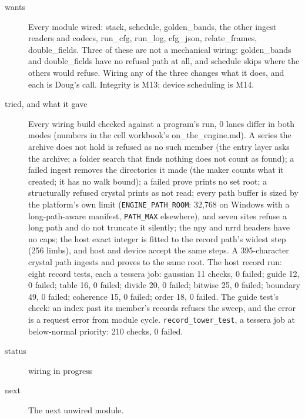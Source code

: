 \begin{description}
\item[{wants}] Every module wired: stack, schedule, golden\_\allowbreak{}bands, the other ingest readers and codecs, run\_\allowbreak{}cfg, run\_\allowbreak{}log, cfg\_\allowbreak{}json, relate\_\allowbreak{}frames, double\_\allowbreak{}fields. Three of these are not a mechanical wiring: golden\_\allowbreak{}bands and double\_\allowbreak{}fields have no refusal path at all, and schedule skips where the others would refuse. Wiring any of the three changes what it does, and each is Doug's call. Integrity is M13; device scheduling is M14.
\item[{tried, and what it gave}] Every wiring build checked against a program's run, 0 lanes differ in both modes (numbers in the cell workbook's on\_\allowbreak{}the\_\allowbreak{}engine.md). A series the archive does not hold is refused as no such member (the entry layer asks the archive; a folder search that finds nothing does not count as found); a failed ingest removes the directories it made (the maker counts what it created; it has no walk bound); a failed prove prints no set root; a structurally refused crystal prints as not read; every path buffer is sized by the platform's own limit (\texttt{ENGINE\_\allowbreak{}PATH\_\allowbreak{}ROOM}: 32,768 on Windows with a long-path-aware manifest, \texttt{PATH\_\allowbreak{}MAX} elsewhere), and seven sites refuse a long path and do not truncate it silently; the npy and nrrd headers have no caps; the host exact integer is fitted to the record path's widest step (256 limbs), and host and device accept the same steps. A 395-character crystal path ingests and proves to the same root. The host record run: eight record tests, each a tessera job: gaussian 11 checks, 0 failed; guide 12, 0 failed; table 16, 0 failed; divide 20, 0 failed; bitwise 25, 0 failed; boundary 49, 0 failed; coherence 15, 0 failed; order 18, 0 failed. The guide test's check: an index past its member's records refuses the sweep, and the error is a request error from module cycle. \texttt{record\_\allowbreak{}tower\_\allowbreak{}test}, a tessera job at below-normal priority: 210 checks, 0 failed.
\item[{status}] wiring in progress
\item[{next}] The next unwired module.
\end{description}

